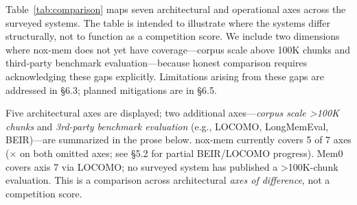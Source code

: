 Table~\ref{tab:comparison} maps seven architectural and operational axes across the
surveyed systems. The table is intended to illustrate where the systems differ
structurally, not to function as a competition score. We include two dimensions where
nox-mem does not yet have coverage---corpus scale above 100K chunks and third-party
benchmark evaluation---because honest comparison requires acknowledging these gaps
explicitly. Limitations arising from these gaps are addressed in \S6.3; planned mitigations
are in \S6.5.

\begin{table}[!ht]
  \caption{Architectural comparison across memory systems. Axes reflect structural design
    choices, not performance rankings. \checkmark\ = implemented; $\approx$ = partial or
    indirect; $\times$ = absent.}
  \label{tab:comparison}
  \centering
  \small
  \begin{minipage}{\linewidth}
    \vspace{4pt}\footnotesize
    Five architectural axes are displayed; two additional axes---\emph{corpus scale
    \textgreater100K chunks} and \emph{3rd-party benchmark evaluation} (e.g., LOCOMO,
    LongMemEval, BEIR)---are summarized in the prose below. nox-mem currently covers
    5 of 7 axes ($\times$ on both omitted axes; see \S5.2 for partial BEIR/LOCOMO
    progress). Mem0 covers axis 7 via LOCOMO; no surveyed system has published a
    \textgreater100K-chunk evaluation. This is a comparison across architectural
    \emph{axes of difference}, not a competition score.
  \end{minipage}
\end{table}


